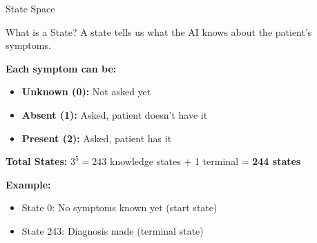 \documentclass[aspectratio=169]{beamer}
\begin{document}
\begin{frame}{State Space}
    \begin{block}{What is a State?}
        A state tells us what the AI knows about the patient's symptoms.
    \end{block}
    
    \vspace{0.3cm}
    
    \textbf{Each symptom can be:}
    \begin{itemize}
        \item \textbf{Unknown (0):} Not asked yet
        \item \textbf{Absent (1):} Asked, patient doesn't have it
        \item \textbf{Present (2):} Asked, patient has it
    \end{itemize}
    
    \vspace{0.3cm}
    
    \textbf{Total States:} $3^5 = 243$ knowledge states + 1 terminal = \textbf{244 states}
    
    \vspace{0.3cm}
    
    \textbf{Example:}
    \begin{itemize}
        \item State 0: No symptoms known yet (start state)
        \item State 243: Diagnosis made (terminal state)
    \end{itemize}
\end{frame}
\end{document}
